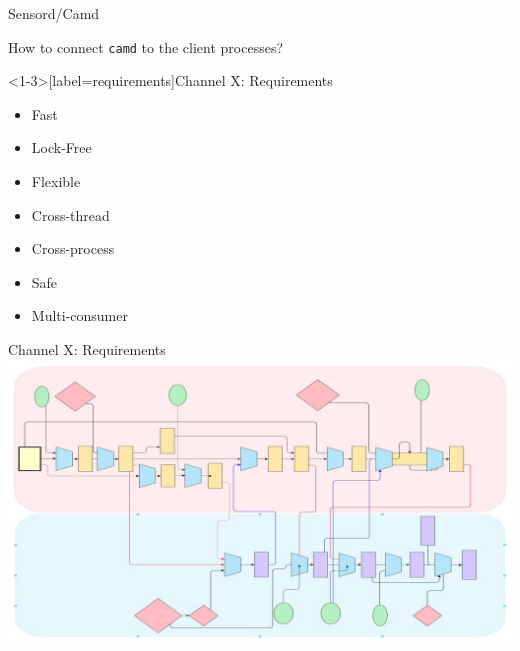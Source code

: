 \documentclass[aspectratio=43]{beamer}
\begin{document}
\begin{frame}{Sensord/Camd}
    \centering
    \begin{Large}
        How to connect \texttt{camd} to the client processes?
    \end{Large}
\end{frame}

\begin{frame}<1-3>[label=requirements]{Channel X: Requirements}
    \begin{itemize}
        \item<1-> Fast
        \item<2-> Lock-Free
        \item<3-> Flexible
        \item<4-> Cross-thread
        \item<5-> Cross-process
        \item<6-> Safe
        \item<7-> Multi-consumer
    \end{itemize}
\end{frame}
\begin{frame}{Channel X: Requirements}
    \centering
    \includegraphics[width=\textwidth]{./imgs/system-graph.jpg}
\end{frame}
\end{document}
